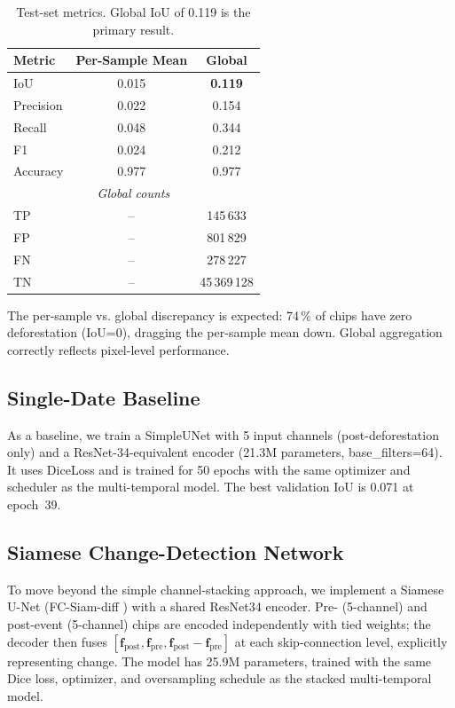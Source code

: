 \documentclass[twocolumn]{article}
\begin{document}
\begin{table}[ht]
\centering
\caption{Test-set metrics.  Global IoU of 0.119 is the primary 
result.}
\label{tab:test}
\begin{tabular}{lcc}
\toprule
Metric & Per-Sample Mean & Global \\
\midrule
IoU          & 0.015 & \textbf{0.119} \\
Precision    & 0.022 & 0.154 \\
Recall       & 0.048 & 0.344 \\
F1           & 0.024 & 0.212 \\
Accuracy     & 0.977 & 0.977 \\
\midrule
\multicolumn{3}{c}{\textit{Global counts}} \\
TP           & -- & 145\,633 \\
FP           & -- & 801\,829 \\
FN           & -- & 278\,227 \\
TN           & -- & 45\,369\,128 \\
\bottomrule
\end{tabular}
\end{table}

The per-sample vs. global discrepancy is expected: 74\,\% of 
chips have zero deforestation (IoU=0), dragging the per-sample 
mean down.  Global aggregation correctly reflects pixel-level 
performance.

\subsection{Single-Date Baseline}

As a baseline, we train a SimpleUNet with 5 input channels 
(post-deforestation only) and a ResNet-34-equivalent encoder 
(21.3M parameters, base\_filters=64).  It uses DiceLoss and is 
trained for 50 epochs with the same optimizer and scheduler as 
the multi-temporal model.  The best validation IoU is 0.071 at 
epoch~39.

\subsection{Siamese Change-Detection Network}

To move beyond the simple channel-stacking approach, we implement 
a Siamese U-Net (FC-Siam-diff \cite{daudt2018fcsiam}) with a 
shared ResNet34 encoder.  Pre- (5-channel) and post-event (5-channel)
chips are encoded independently with tied weights; the decoder then 
fuses $[\mathbf{f}_{\text{post}}, \mathbf{f}_{\text{pre}}, 
\mathbf{f}_{\text{post}} - \mathbf{f}_{\text{pre}}]$ at each 
skip-connection level, explicitly representing change.  The model 
has 25.9M parameters, trained with the same Dice loss, optimizer, 
and oversampling schedule as the stacked multi-temporal model.
\end{document}
